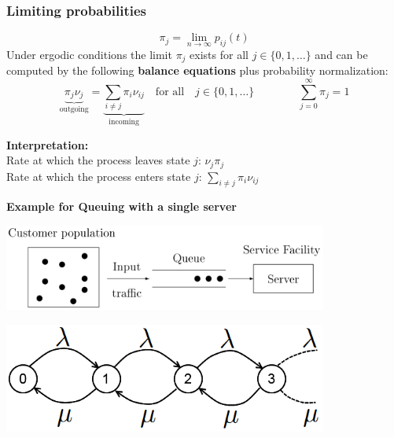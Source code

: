 \subsubsection{Limiting probabilities }
$$\pi_j=\lim\limits_{n\rightarrow \infty}{p_{ij}(t)}$$
Under ergodic conditions the limit $\pi_j$ exists for all $j \in\{0,1,\ldots\}$ and can be computed by the following \textbf{balance equations} plus probability normalization:
$$\boxed{\underbrace{\pi_j\nu_j}_{\text{outgoing}}=\underbrace{\sum\limits_{i\neq j}{\pi_i \nu_{ij}}}_{\text{incoming}}\quad \text{for all} \quad j\in\{0,1,\ldots \}
\qquad \qquad \sum\limits_{j=0}^{\infty}{\pi_j=1}}$$

\textbf{Interpretation: }\\
Rate at which the process leaves state $j$: $\nu_j\pi_j$\\
Rate at which the process enters state $j$: $\sum\limits_{i\neq j}{\pi_i \nu_{ij}}$

\textbf{Example for Queuing with a single server}\\
\begin{minipage}{10.5cm}
\includegraphics[width=0.8\textwidth]{Content/Markov/Queue.png}
\end{minipage}
\hfill
\begin{minipage}{7.5cm}
\includegraphics[width=0.8\textwidth]{Content/Markov/queieingGraph.png}
\end{minipage}

